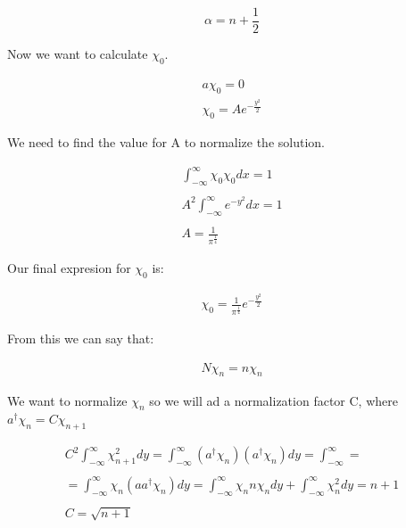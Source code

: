 \begin{equation}
  \alpha = n+\frac{1}{2}
\end{equation}

Now we want to calculate $\chi_0$.

\begin{equation}
  \begin{array}{c}
    a\chi_0 = 0
    \\
    \chi_0 = A e^{-\frac{y^2}{2}}
  \end{array}
\end{equation}

We need to find the value for A to normalize the solution.

\begin{equation}
  \begin{array}{c}
    \int_{-\infty}^{\infty} \chi_0 \chi_0 dx = 1
    \\

    \\
    A^2 \int_{-\infty}^{\infty} e^{-y^2} dx = 1
    \\

    \\
    A=\frac{1}{\pi^{\frac{1}{4}}}
  \end{array}
\end{equation}

Our final expresion for $\chi_0$ is:

\begin{equation}
  \begin{array}{c}
    \chi_0 = \frac{1}{\pi^{\frac{1}{4}}} e^{-\frac{y^2}{2}}
  \end{array}
\end{equation}

From this we can say that:

\begin{equation}
  \begin{array}{c}
    N\chi_n = n \chi_n
  \end{array}
\end{equation}

We want to normalize $\chi_n$ so we will ad a normalization factor C, where $a^\dagger\chi_n=C\chi_{n+1}$

\begin{equation}
  \begin{array}{c}
    C^2 \int_{-\infty}^{\infty} \chi^2_{n+1} dy = \int_{-\infty}^{\infty} (a^\dagger\chi_n)(a^\dagger\chi_n)dy = \int_{-\infty}^{\infty} =
    \\

    \\
    = \int_{-\infty}^{\infty}\chi_n(aa^\dagger\chi_n)dy=\int_{-\infty}^{\infty}\chi_n n\chi_n dy + \int_{-\infty}^{\infty}\chi_n^2dy= n+1
    \\

    \\
    C = \sqrt{n+1}
  \end{array}
\end{equation}

